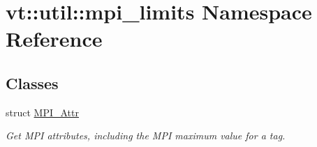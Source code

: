 \hypertarget{namespacevt_1_1util_1_1mpi__limits}{}\section{vt\+:\+:util\+:\+:mpi\+\_\+limits Namespace Reference}
\label{namespacevt_1_1util_1_1mpi__limits}
\subsection*{Classes}
\begin{DoxyCompactItemize}
\item 
struct \hyperlink{structvt_1_1util_1_1mpi__limits_1_1_m_p_i___attr}{M\+P\+I\+\_\+\+Attr}
\begin{DoxyCompactList}\small\item\em Get M\+PI attributes, including the M\+PI maximum value for a tag. \end{DoxyCompactList}\end{DoxyCompactItemize}
